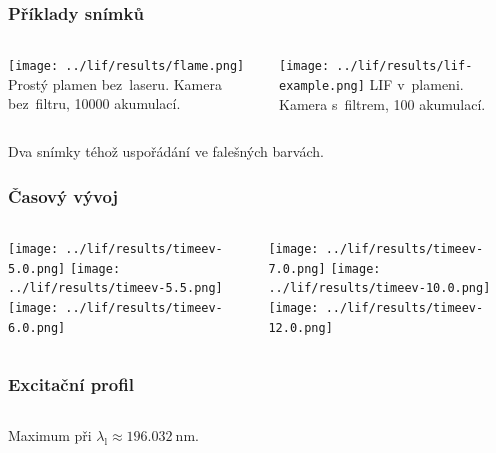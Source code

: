\documentclass{beamer}
\newcommand\wavelen{\lambda}
\newcommand\wavelenlaser{\wavelen_\text{l}}
\begin{document}
\begin{frame}
	\frametitle{Příklady snímků}
	\begin{columns}[t]
		\begin{column}{0.48\textwidth}
			\texttt{[image: ../lif/results/flame.png]}
			Prostý plamen bez~laseru. Kamera bez~filtru, 10000 akumulací.
		\end{column}
		\begin{column}{0.48\textwidth}
			\texttt{[image: ../lif/results/lif-example.png]}
			LIF v~plameni. Kamera s~filtrem, 100 akumulací.
		\end{column}
	\end{columns}
	\bigskip
	Dva snímky téhož uspořádání ve falešných barvách.
\end{frame}

\begin{frame}
	\frametitle{Časový vývoj}
	\begin{columns}[c]
		\begin{column}{0.48\textwidth}
			\centering
			\texttt{[image: ../lif/results/timeev-5.0.png]}
			\texttt{[image: ../lif/results/timeev-5.5.png]}
			\texttt{[image: ../lif/results/timeev-6.0.png]}
		\end{column}
		\begin{column}{0.48\textwidth}
			\centering
			\texttt{[image: ../lif/results/timeev-7.0.png]}
			\texttt{[image: ../lif/results/timeev-10.0.png]}
			\texttt{[image: ../lif/results/timeev-12.0.png]}
		\end{column}
	\end{columns}
\end{frame}

\begin{frame}
	\frametitle{Excitační profil}
	\begin{columns}[c]
		\begin{column}{0.48\textwidth}
		\end{column}
		\begin{column}{0.48\textwidth}
		\end{column}
	\end{columns}
	\bigskip
	Maximum při $\wavelenlaser \approx \SI{196.032}{\nano\metre}$.
\end{frame}
\end{document}
